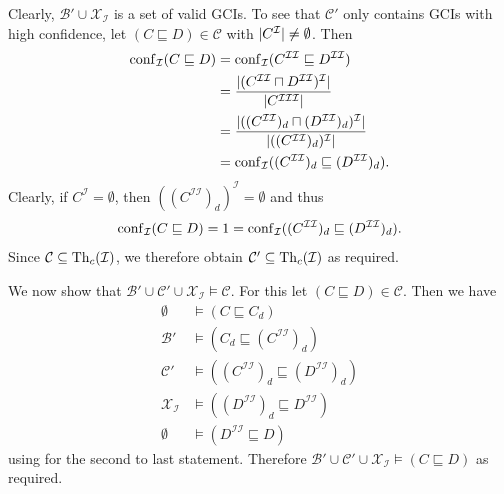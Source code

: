 \begin{Proof}
  Clearly, $\mathcal{B}' \cup \mathcal{X}_{\mathcal{I}}$ is a set of valid GCIs.  To see
  that $\mathcal{C}'$ only contains GCIs with high confidence, let $(C \sqsubseteq D) \in
  \mathcal{C}$ with $\lvert C^{\mathcal{I}} \rvert \neq \emptyset$.  Then
  \begin{align*}
    \operatorname{conf}_{\mathcal{I}}( C \sqsubseteq D )
    &= \operatorname{conf}_{\mathcal{I}}( C^{\mathcal{I}\mathcal{I}} \sqsubseteq D^{\mathcal{I}\mathcal{I}} )\\
    &= \frac{ | ( C^{\mathcal{I}\mathcal{I}} \sqcap D^{\mathcal{I}\mathcal{I}}
      )^{\mathcal{I}} | }{ | C^{\mathcal{I}\mathcal{I}\mathcal{I}} | }\\
    &= \frac{ | ( (C^{\mathcal{I}\mathcal{I}})_d \sqcap (D^{\mathcal{I}\mathcal{I}})_{d}
      )^{\mathcal{I}} | }{ | ((C^{\mathcal{I}\mathcal{I}})_{d})^{\mathcal{I}} | }\\
    &= \operatorname{conf}_{\mathcal{I}}( (C^{\mathcal{I}\mathcal{I}})_{d} \sqsubseteq
    (D^{\mathcal{I}\mathcal{I}})_{d} ).
  \end{align*}
  Clearly, if $C^{\mathcal{I}} = \emptyset$, then
  $((C^{\mathcal{I}\mathcal{I}})_{d})^{\mathcal{I}} = \emptyset$ and thus
  \begin{equation*}
    \operatorname{conf}_{\mathcal{I}}( C \sqsubseteq D ) = 1 = \operatorname{conf}_{\mathcal{I}}(
    (C^{\mathcal{I}\mathcal{I}})_{d} \sqsubseteq
    (D^{\mathcal{I}\mathcal{I}})_{d} ).
  \end{equation*}
  Since $\mathcal{C} \subseteq \operatorname{Th}_c(\mathcal{I})$, we therefore obtain $\mathcal{C}'
  \subseteq \operatorname{Th}_c(\mathcal{I})$ as required.

  We now show that $\mathcal{B}' \cup \mathcal{C}' \cup \mathcal{X}_{\mathcal{I}} \models
  \mathcal{C}$.  For this let $(C \sqsubseteq D) \in \mathcal{C}$.  Then we have
  \begin{align*}
    \emptyset &\models (C \sqsubseteq C_{d})\\
    \mathcal{B}' &\models (C_{d} \sqsubseteq (C^{\mathcal{I}\mathcal{I}})_{d})\\
    \mathcal{C}' &\models ((C^{\mathcal{I}\mathcal{I}})_{d} \sqsubseteq
    (D^{\mathcal{I}\mathcal{I}})_{d})\\
    \mathcal{X}_{\mathcal{I}} &\models ((D^{\mathcal{I}\mathcal{I}})_{d} \sqsubseteq
    D^{\mathcal{I}\mathcal{I}})\\
    \emptyset &\models (D^{\mathcal{I}\mathcal{I}} \sqsubseteq D)
  \end{align*}
  using  for the second to last statement.  Therefore
  $\mathcal{B}' \cup \mathcal{C}' \cup \mathcal{X}_{\mathcal{I}} \models (C \sqsubseteq
  D)$ as required.


\end{Proof}
